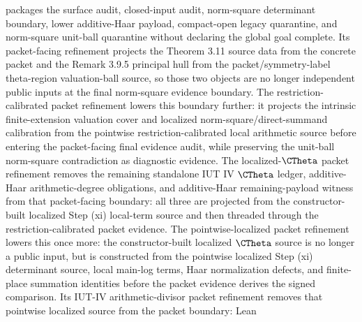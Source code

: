 \begin{proposition}
  packages the surface audit, closed-input audit, norm-square determinant
  boundary, lower additive-Haar payload, compact-open legacy quarantine, and
  norm-square unit-ball quarantine without declaring the global goal complete.
  Its packet-facing refinement
  projects the Theorem 3.11 source data from the concrete packet and the
  Remark 3.9.5 principal hull from the packet/symmetry-label theta-region
  valuation-ball source, so those two objects are no longer independent
  public inputs at the final norm-square evidence boundary.
  The restriction-calibrated packet refinement
  lowers this boundary further: it projects the intrinsic finite-extension
  valuation cover and localized norm-square/direct-summand calibration from the
  pointwise restriction-calibrated local arithmetic source before entering the
  packet-facing final evidence audit, while preserving the unit-ball
  norm-square contradiction as diagnostic evidence.
  The localized-\(\CTheta\) packet refinement
  removes the remaining standalone IUT IV \(\CTheta\) ledger, additive-Haar
  arithmetic-degree obligations, and additive-Haar remaining-payload witness
  from that packet-facing boundary: all three are projected from the
  constructor-built localized Step (xi) local-term source and then threaded
  through the restriction-calibrated packet evidence.
  The pointwise-localized packet refinement
  lowers this once more: the constructor-built localized \(\CTheta\) source is
  no longer a public input, but is constructed from the pointwise localized
  Step (xi) determinant source, local main-log terms, Haar normalization
  defects, and finite-place summation identities before the packet evidence
  derives the signed comparison.
  Its IUT-IV arithmetic-divisor packet refinement
  removes that pointwise localized source from the packet boundary: Lean

\end{proposition}
